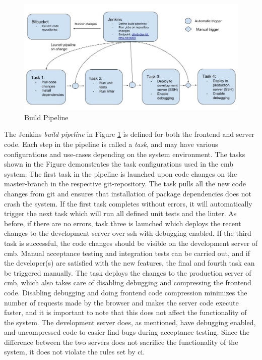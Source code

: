 \begin{figure}
  \includegraphics[width=1.0\textwidth]{figs/build_pipeline.jpg}
  \caption[Build Pipeline]{Build Pipeline}
  \label{fig:server-ci}
\end{figure}

The Jenkins \textit{build pipeline} in Figure \ref{fig:server-ci} is defined for both the frontend and server code. Each step in the pipeline is called a \textit{task}, and may have various configurations and use-cases depending on the system environment. The tasks shown in the Figure demonstrates the task configurations used in the \gls{cmb} system. The first task in the pipeline is launched upon code changes on the master-branch in the respective git-repository. The task pulls all the new code changes from git and ensures that installation of package dependencies does not crash the system. If the first task completes without errors, it will automatically trigger the next task which will run all defined unit tests and the linter. As before, if there are no errors, task three is launched which deploys the recent changes to the development server over \gls{ssh} with debugging enabled. If the third task is successful, the code changes should be visible on the development server of \gls{cmb}. Manual acceptance testing and integration tests can be carried out, and if the developer(s) are satisfied with the new features, the final and fourth task can be triggered manually. The task deploys the changes to the production server of \gls{cmb}, which also takes care of disabling debugging and compressing the frontend code. Disabling debugging and doing frontend code compression minimizes the number of requests made by the browser and makes the server code execute faster, and it is important to note that this does not affect the functionality of the system. The development server does, as mentioned, have debugging enabled, and uncompressed code to easier find bugs during acceptance testing. Since the difference between the two servers does not sacrifice the functionality of the system, it does not violate the rules set by \gls{ci}.  \\

